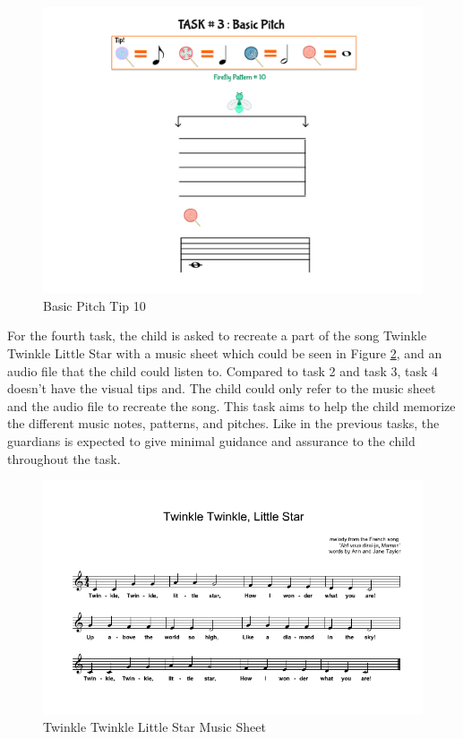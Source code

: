 \begin{figure}[H]
    \centering
    \includegraphics[width=12cm]{figures/NewFigures/BasicPitchTip10.png}
    \caption{Basic Pitch Tip 10}
    \label{fig:BasicPitchTip10}
\end{figure}

For the fourth task, the child is asked to recreate a part of the song Twinkle Twinkle Little Star with a music sheet which could be seen in Figure \ref{fig:TTLSMusicSheet}, and an audio file that the child could listen to. Compared to task 2 and task 3, task 4 doesn't have the visual tips and. The child could only refer to the music sheet and the audio file to recreate the song. This task aims to help the child memorize the different music notes, patterns, and pitches. Like in the previous tasks, the guardians is expected to give minimal guidance and assurance to the child throughout the task. 

\begin{figure}[H!]
    \centering
    \includegraphics[width=15cm]{figures/NewFigures/TwinkleTwinkleLittleStarMusicSheet.png}
    \caption{Twinkle Twinkle Little Star Music Sheet}
    \label{fig:TTLSMusicSheet}
\end{figure}

